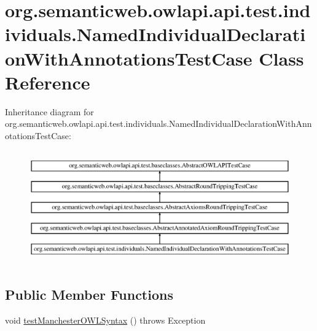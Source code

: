 \hypertarget{classorg_1_1semanticweb_1_1owlapi_1_1api_1_1test_1_1individuals_1_1_named_individual_declaration_with_annotations_test_case}{\section{org.\-semanticweb.\-owlapi.\-api.\-test.\-individuals.\-Named\-Individual\-Declaration\-With\-Annotations\-Test\-Case Class Reference}
\label{classorg_1_1semanticweb_1_1owlapi_1_1api_1_1test_1_1individuals_1_1_named_individual_declaration_with_annotations_test_case}
}
Inheritance diagram for org.\-semanticweb.\-owlapi.\-api.\-test.\-individuals.\-Named\-Individual\-Declaration\-With\-Annotations\-Test\-Case\-:\begin{figure}[H]
\begin{center}
\leavevmode
\includegraphics[height=4.938272cm]{classorg_1_1semanticweb_1_1owlapi_1_1api_1_1test_1_1individuals_1_1_named_individual_declaration_with_annotations_test_case}
\end{center}
\end{figure}
\subsection*{Public Member Functions}
\begin{DoxyCompactItemize}
\item 
void \hyperlink{classorg_1_1semanticweb_1_1owlapi_1_1api_1_1test_1_1individuals_1_1_named_individual_declaration_with_annotations_test_case_a3507db33880203f848b7677f4ef25feb}{test\-Manchester\-O\-W\-L\-Syntax} ()  throws Exception 
\end{DoxyCompactItemize}
